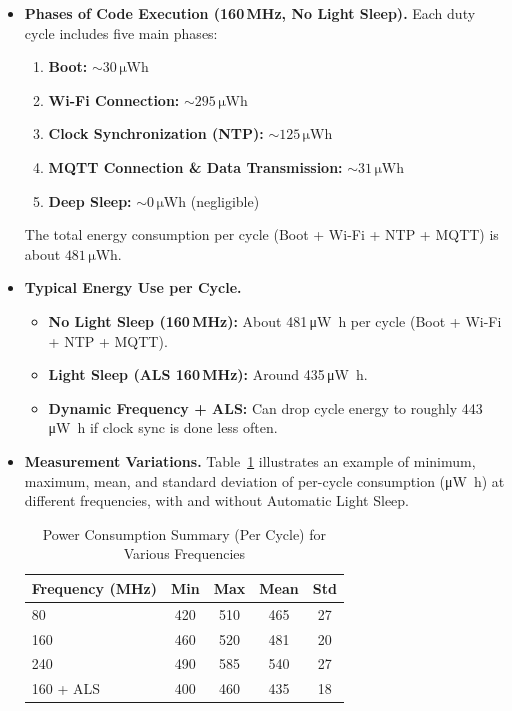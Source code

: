 \documentclass[A4,10pt]{article}
\begin{document}
\begin{itemize}
	\item \textbf{Phases of Code Execution (160\,MHz, No Light Sleep).} Each duty cycle includes five main phases:
    \begin{enumerate}
      \item \textbf{Boot:} \(\sim 30\,\si{\micro\watt\hour}\)
      \item \textbf{Wi-Fi Connection:} \(\sim 295\,\si{\micro\watt\hour}\)
      \item \textbf{Clock Synchronization (NTP):} \(\sim 125\,\si{\micro\watt\hour}\)
      \item \textbf{MQTT Connection \& Data Transmission:} \(\sim 31\,\si{\micro\watt\hour}\)
      \item \textbf{Deep Sleep:} \(\sim 0\,\si{\micro\watt\hour}\) (negligible)
    \end{enumerate}
    \noindent The total energy consumption per cycle (Boot + Wi-Fi + NTP + MQTT) is about \(481\,\si{\micro\watt\hour}\).
    
  \item \textbf{Typical Energy Use per Cycle.}
    \begin{itemize}
      \item \textbf{No Light Sleep (160\,MHz):} About 481\,\si{\micro\watt\hour} per cycle (Boot + Wi-Fi + NTP + MQTT).
      \item \textbf{Light Sleep (ALS 160\,MHz):} Around 435\,\si{\micro\watt\hour}.
      \item \textbf{Dynamic Frequency + ALS:} Can drop cycle energy to roughly 443\,\si{\micro\watt\hour} if clock sync is done less often.
    \end{itemize}

  \item \textbf{Measurement Variations.}
  Table~\ref{tab:power_summary} illustrates an example of minimum, maximum, mean, and standard deviation of per-cycle consumption (\si{\micro\watt\hour}) at different frequencies, with and without Automatic Light Sleep.

  \begin{table}[h!]
    \centering
    \caption{Power Consumption Summary (Per Cycle) for Various Frequencies}
    \label{tab:power_summary}
    \begin{tabular}{lcccc}
      \hline
      \textbf{Frequency (MHz)} & \textbf{Min} & \textbf{Max} & \textbf{Mean} & \textbf{Std} \\
      \hline
      80          & 420 & 510 & 465 & 27 \\
      160         & 460 & 520 & 481 & 20 \\
      240         & 490 & 585 & 540 & 27 \\
      160 + ALS   & 400 & 460 & 435 & 18 \\
      \hline
    \end{tabular}
  \end{table}


\end{itemize}
\end{document}
